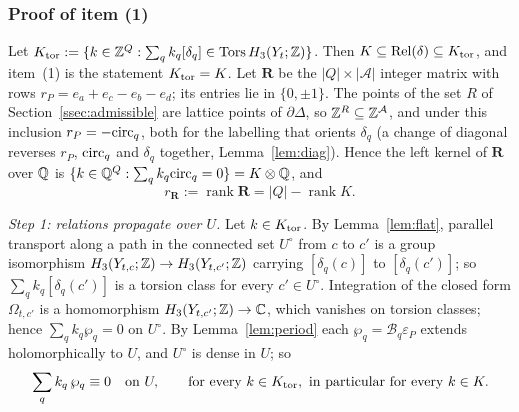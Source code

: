 \subsubsection*{Proof of item (1)}
Let $K_{\rm tor}:=\{k\in\mathbb Z^Q:\sum_qk_q[\delta_q]\in\operatorname{Tors} H_3(Y_t;\mathbb Z)\}$. Then $K\subseteq\operatorname{Rel}(\delta)\subseteq K_{\rm tor}$, and item~(1) is the
statement $K_{\rm tor}=K$. Let $\mathbf R$ be the $|Q|\times|\mathcal A|$ integer matrix with rows $r_P=e_a+e_c-e_b-e_d$; its entries lie in
$\{0,\pm1\}$. The points of the set $R$ of Section~\ref{ssec:admissible} are lattice points of $\partial\Delta$, so
$\mathbb Z^R\subseteq\mathbb Z^{\mathcal A}$, and under this inclusion $r_P=-\mathrm{circ}_q$, both for the labelling that orients $\delta_q$
(a change of diagonal reverses $r_P$, $\mathrm{circ}_q$ and $\delta_q$ together, Lemma~\ref{lem:diag}). Hence the left kernel of $\mathbf R$ over $\mathbb Q$ is
$\{k\in\mathbb Q^Q:\sum_qk_q\mathrm{circ}_q=0\}=K\otimes\mathbb Q$, and
\[
r_{\mathbf R}:=\operatorname{rank}\mathbf R=|Q|-\operatorname{rank}K .
\]

\emph{Step 1: relations propagate over $U$.} Let $k\in K_{\rm tor}$. By Lemma~\ref{lem:flat}, parallel transport along a path in
the connected set $U^\circ$ from $c$ to $c'$ is a group isomorphism $H_3(Y_{t,c};\mathbb Z)\to H_3(Y_{t,c'};\mathbb Z)$ carrying
$[\delta_q(c)]$ to $[\delta_q(c')]$; so $\sum_qk_q[\delta_q(c')]$ is a torsion class for every $c'\in U^\circ$.
Integration of the closed form $\Omega_{t,c'}$ is a homomorphism $H_3(Y_{t,c'};\mathbb Z)\to\mathbb C$, which vanishes on torsion
classes; hence $\sum_qk_q\wp_q=0$ on $U^\circ$. By Lemma~\ref{lem:period} each $\wp_q=\mathcal B_q\varepsilon_P$ extends
holomorphically to $U$, and $U^\circ$ is dense in $U$; so
\begin{equation}\label{eq:periodrel}
\sum_qk_q\,\wp_q\equiv0\quad\text{on }U,\qquad\text{for every }k\in K_{\rm tor},\ \text{in particular for every }k\in K .
\end{equation}

